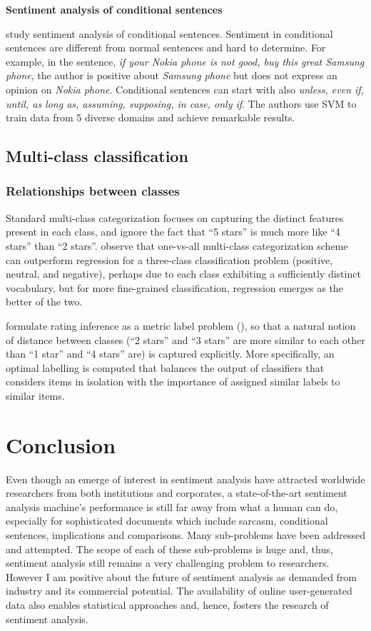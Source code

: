 \documentclass{article}
\begin{document}
\begin{multicols}{2}
       \textbf{Sentiment analysis of conditional sentences}

        \citet{Narayanan2009} study sentiment analysis of conditional sentences.
Sentiment in conditional sentences are different from normal sentences and hard
to determine. For example, in the sentence, \textit{if your Nokia phone is not
good, buy this great Samsung phone}, the author is positive about \textit{
Samsung phone} but does not express an opinion on \textit{Nokia phone}.
Conditional sentences can start with also \textit{unless, even if, until, as long
as, assuming, supposing, in case, only if}. The authors use SVM to train data
from 5 diverse domains and achieve remarkable results.


  \subsection{Multi-class classification}
    \subsubsection{Relationships between classes}
        Standard multi-class categorization focuses on capturing the
distinct features present in each class, and ignore the fact that ``5 stars'' is
much more like ``4 stars'' than ``2 stars''. \cite{Pang2005} observe that
one-vs-all multi-class categorization scheme can outperform regression for a
three-class classification problem (positive, neutral, and negative), perhaps
due to each class exhibiting a sufficiently distinct vocabulary, but for more
fine-grained classification, regression emerges as the better of the two.
        
        \citet{Pang2005} formulate rating inference as a metric label
problem (\citet{Kleinberg2002}), so that a natural notion of distance between
classes (``2 stars'' and ``3 stars'' are more similar to each other than ``1
star'' and ``4 stars'' are) is captured explicitly. More specifically, an
optimal labelling is computed that balances the output of classifiers that
considers items in isolation with the importance of assigned similar labels to
similar items.

\section{Conclusion}
    Even though an emerge of interest in sentiment analysis have attracted 
worldwide researchers from both institutions and corporates, a state-of-the-art
sentiment analysis machine's performance is still far away from what a human can
do, especially for sophisticated documents which include sarcasm, conditional
sentences, implications and comparisons. Many sub-problems have been addressed
and attempted. The scope of each of these sub-problems is huge and, thus, 
sentiment analysis still remains a very challenging problem to researchers.
However I am positive about the future of sentiment analysis as demanded from
industry and its commercial potential. The availability of online user-generated 
data also enables statistical approaches and, hence, fosters the research 
of sentiment analysis.




\end{multicols}
\end{document}
